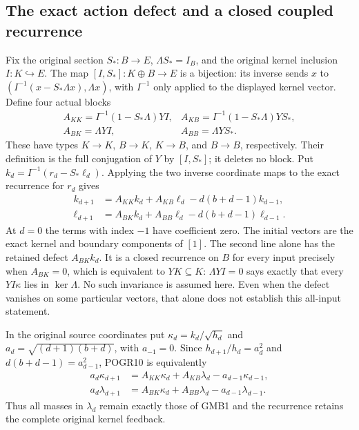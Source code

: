 \subsection{The exact action defect and a closed coupled recurrence}
Fix the original section $S_*:B\to E$, $\Lambda S_*=I_B$, and the
original kernel inclusion $I:K\hookrightarrow E$. The map
$[I,S_*]:K\oplus B\to E$ is a bijection: its inverse sends
$x$ to $(I^{-1}(x-S_*\Lambda x),\Lambda x)$, with $I^{-1}$ only
applied to the displayed kernel vector. Define four actual blocks
\[
 \begin{array}{ll}
 A_{KK}=I^{-1}(1-S_*\Lambda)YI,&
 A_{KB}=I^{-1}(1-S_*\Lambda)YS_*,\\
 A_{BK}=\Lambda YI,& A_{BB}=\Lambda YS_*.
 \end{array}\tag{POGR9}
\]
These have types $K\to K$, $B\to K$, $K\to B$, and $B\to B$,
respectively. Their definition is the full conjugation of $Y$ by
$[I,S_*]$; it deletes no block. Put
$k_d=I^{-1}(r_d-S_*\ell_d)$. Applying the two inverse coordinate
maps to the exact recurrence for $r_d$ gives
\[
 \begin{split}
 k_{d+1}&=A_{KK}k_d+A_{KB}\ell_d-d(b+d-1)k_{d-1},\\
 \ell_{d+1}&=A_{BK}k_d+A_{BB}\ell_d-d(b+d-1)\ell_{d-1}.
 \end{split}\tag{POGR10}
\]
At $d=0$ the terms with index $-1$ have coefficient zero. The initial
vectors are the exact kernel and boundary components of $[1]$.
The second line alone has the retained defect $A_{BK}k_d$. It is a
closed recurrence on $B$ for every input precisely when
$A_{BK}=0$, which is equivalent to $YK\subseteq K$:
$\Lambda YI=0$ says exactly that every $YI\kappa$ lies in
$\ker\Lambda$. No such invariance is assumed here. Even when the
defect vanishes on some particular vectors, that alone does not
establish this all-input statement.

In the original source coordinates put
$\kappa_d=k_d/\sqrt{h_d}$ and
$a_d=\sqrt{(d+1)(b+d)}$, with $a_{-1}=0$. Since
$h_{d+1}/h_d=a_d^2$ and $d(b+d-1)=a_{d-1}^2$, POGR10 is
equivalently
\[
 \begin{split}
 a_d\kappa_{d+1}
   &=A_{KK}\kappa_d+A_{KB}\lambda_d-a_{d-1}\kappa_{d-1},\\
 a_d\lambda_{d+1}
   &=A_{BK}\kappa_d+A_{BB}\lambda_d-a_{d-1}\lambda_{d-1}.
 \end{split}\tag{POGR11}
\]
Thus all masses in $\lambda_d$ remain exactly those of GMB1 and
the recurrence retains the complete original kernel feedback.

